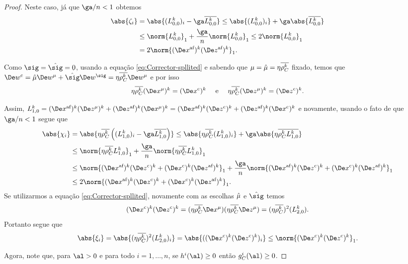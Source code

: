 \begin{proof}
Neste caso, já que $\ga/n < 1$ obtemos
\begin{align}
\abs{\zeta_i} & = \abs{(L_{0,0}^{k})_i - \ga \dbvec{L_{0,0}^{k}}} \leq \abs{(L_{0,0}^{k})_i} + \ga \abs{\dbvec{L_{0,0}^{k}}} \notag \\
			  & \leq	\norm{L_{0,0}^{k}}_1  + \dfrac{\ga}{n}\norm{L_{0,0}^{k}}_1   \leq 2\norm{L_{0,0}^{k}}_1 \notag \\
			  & \label{eq:bound-zeta-i} = 2\norm{ \dekx  \dekz }_1.   %
\end{align}

Como $\sig = \nextsig=0$, usando a equação \eqref{eq:Corrector-spllited} e sabendo que $\mu=\hat{\mu} = \eta\overline{\rho_C^{k}}$ fixado, temos que $\Decow = \nextmu \Dew^{\mu} + \nextsig
\Dew^{\sig} = \eta\rhoCkb \Dew^\mu $ e por isso 
	\[
		 \eta\rhoCkb (\Dex^\mu)^{k} = \Dekcox     \quad \text{ e } \quad    \eta\rhoCkb (\Dez^\mu)^{k} = \Dekcoz .
	\]

	Assim, $ L_{1,0}^{k} = \dekx(\Dez^\mu)^{k} +
			\dekz(\Dex^\mu)^{k} = \dekx\Dekcoz +
			\dekz\Dekcox $ e novamente, usando o fato de que $\ga/n < 1$ segue que
\begin{align}
	\abs{\chi_i }  	& = \abs{\eta\rhoCkb  \left( ({L_{1,0}^{k}})_i - \ga\dbvec{L_{1,0}^{k}} \right)} \leq \abs{\eta\rhoCkb   ({L_{1,0}^{k}})_i} + \ga\abs { \eta\rhoCkb \dbvec{L_{1,0}^{k}}} 
					\notag \\
					&\leq \norm{\eta\rhoCkb   L_{1,0}^{k}}_1 + \dfrac{\ga}{n}\norm{\eta\rhoCkb   L_{1,0}^{k}}_1 \notag\\
					& \leq \norm{ \dekx \Dekcoz + \Dekcox \dekz }_1 + \dfrac{\ga}{n}\norm{ \dekx \Dekcoz + \Dekcox \dekz }_1 \notag\\
					& \label{eq:bound-chi-i} \leq 2 \norm{ \dekx \Dekcoz + \Dekcox \dekz }_1. %
\end{align}
Se utilizarmos  a equação \eqref{eq:Corrector-spllited}, novamente com as escolhas $\hat{\mu} $ e $\nextsig$ temos
\[
	\Dekcox\Dekcoz = (\eta\rhoCkb \Dex^\mu)(\eta\rhoCkb \Dez^\mu) = (\eta\rhoCkb )^2(L_{2,0}^{k}).
\]
Portanto segue que
\begin{equation}\label{eq:bound-xi-i}
	\abs{\xi_i}	 =  \abs{(\eta\rhoCkb )^2(L_{2,0}^{k})_i}  = \abs{(\Dekcox\Dekcoz)_i} \leq \norm{\Dekcox\Dekcoz}_1.%
\end{equation}
	


Agora, note que, para $\al>0$ e para todo $i=1,\ldots,n$, se $h^i(\al)\geq0$ então $g_C^i(\al)\geq 0$. 


\end{proof}
